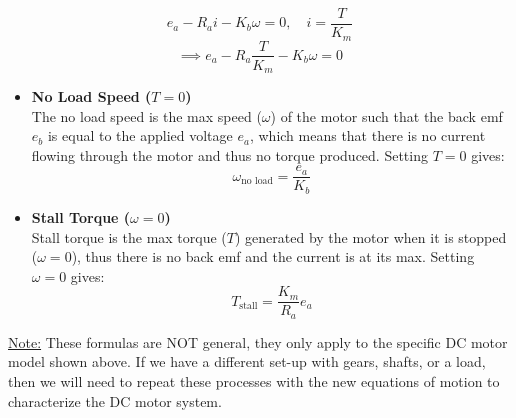 \documentclass[12pt]{article}
\begin{document}
\[e_a - R_a i -K_b\omega= 0 , \quad i=\frac{T}{K_m}\]
\[\implies e_a - R_a \frac{T}{K_m} - K_b\omega = 0\]
\begin{itemize}
    \item \textbf{No Load Speed ($T=0$)}\\
    The no load speed is the max speed ($\omega$) of the motor such that the back emf $e_b$ is equal to the applied voltage $e_a$, which means that there is no current flowing through the motor and thus no torque produced. Setting $T=0$ gives:
    \[\omega_\text{no load} = \frac{e_a}{K_b}\]
    \item \textbf{Stall Torque ($\omega=0$)}\\
    Stall torque is the max torque ($T$) generated by the motor when it is stopped ($\omega=0$), thus there is no back emf and the current is at its max. Setting $\omega=0$ gives:
    \[T_\text{stall} = \frac{K_m}{R_a} e_a\]
\end{itemize}
\underline{Note:} These formulas are NOT general, they only apply to the specific DC motor model shown above. If we have a different set-up with gears, shafts, or a load, then we will need to repeat these processes with the new equations of motion to characterize the DC motor system.
\end{document}
